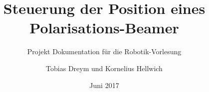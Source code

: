 \documentclass[
	paper=a4,
	a4paper,
	11pt,
	abstract=on,
	]{scrartcl}
\title{Steuerung der Position eines Polarisations-Beamer}
\subtitle{Projekt Dokumentation für die Robotik-Vorlesung}
\author{Tobias Dreym und Kornelius Hellwich}
\date{Juni 2017}
\begin{document}
	\titlehead{\vspace{-50pt}\centering\texttt{[image: images/dhbw.png]}\vspace{-50pt}}
	
	\maketitle
	
	
	\tableofcontents
	\clearpage

	\pagestyle{headings}
	
	
	
\end{document}
